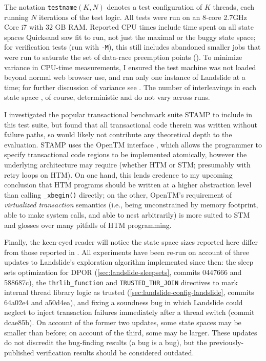 The notation {\tt testname}$(K,N)$ %
denotes a test configuration of $K$ threads, each running $N$ iterations of the test logic.
All tests were run on an 8-core 2.7GHz Core i7 with 32 GB RAM.
Reported CPU times include time spent on all state spaces
Quicksand saw fit to run,
not just the maximal or the buggy state space;
for verification tests (run with {\tt -M}),
this still includes abandoned smaller jobs that were run to saturate the set of data-race preemption points
().
To minimize variance in CPU-time measurements,
I ensured the test machine was not loaded beyond normal web browser use,
and ran only one instance of Landslide at a time;
for further discussion of variance see \cite{sigbovik-htm}.
The number of interleavings in each state space , of course, deterministic and do not vary across runs.

I investigated the popular transactional benchmark suite STAMP \cite{stamp}
to include in this test suite,
but found that all transactional code therein was written without failure paths,
so would likely not contribute any theoretical depth to the evaluation.
STAMP uses the OpenTM interface \cite{opentm},
which allows the programmer to specify transactional code regions to be implemented atomically,
however the underlying architecture may require
(whether HTM or STM; presumably with retry loops on HTM).
On one hand,
this lends credence to my upcoming conclusion
that HTM programs should be written at a higher abstraction level than calling {\tt \_xbegin()} directly;
on the other,
OpenTM's requirement of {\em virtualized transaction} semantics
(i.e., being unconstrained by memory footprint, able to make system calls, and able to nest arbitrarily)
is more suited to STM and glosses over many pitfalls of HTM programming.

Finally, the keen-eyed reader will notice the state space sizes reported here
differ from those reported in \cite{sigbovik-htm}.
All experiments have been re-run
on account of three updates to Landslide's exploration algorithm
implemented since then:
the sleep sets optimization for DPOR (\cref{sec:landslide-sleepsets}, commits 0447666 and 588687c),
the {\tt thrlib\_function} and {\tt TRUSTED\_THR\_JOIN} directives
to mark internal thread library logic as trusted
(\cref{sec:landslide-config-landslide}, commits 64a02e4 and a50d4ea),
and fixing a soundness bug in which Landslide could neglect to inject transaction failures
immediately after a thread switch (commit dcae85b).
On account of the former two updates, some state spaces may be smaller than before;
on account of the third, some may be larger.
These updates do not discredit the bug-finding results (a bug is a bug),
but the previously-published verification results should be considered outdated.

